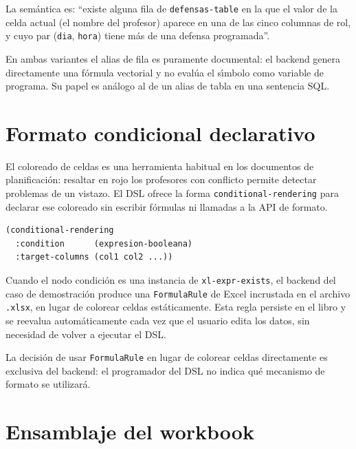 La sem\'antica es: ``existe alguna fila de \texttt{defensas-table} en la que
el valor de la celda actual (el nombre del profesor) aparece en una de las
cinco columnas de rol, y cuyo par (\texttt{dia}, \texttt{hora}) tiene m\'as
de una defensa programada''.

En ambas variantes el alias de fila es puramente documental: el backend
genera directamente una f\'ormula vectorial y no eval\'ua el s\'{\i}mbolo
como variable de programa.  Su papel es an\'alogo al de un alias de tabla
en una sentencia SQL.

\section{Formato condicional declarativo}
\label{sec:formato-condicional-dsl}

El coloreado de celdas es una herramienta habitual en los documentos de
planificaci\'on: resaltar en rojo los profesores con conflicto permite
detectar problemas de un vistazo.  El DSL ofrece la forma
\texttt{conditional-rendering} para declarar ese coloreado sin escribir
f\'ormulas ni llamadas a la API de formato.

\begin{lstlisting}[language=CommonLisp,
  caption={Sintaxis de conditional-rendering.}]
(conditional-rendering
  :condition      (expresion-booleana)
  :target-columns (col1 col2 ...))
\end{lstlisting}

Cuando el nodo condici\'on es una instancia de \texttt{xl-expr-exists}, el
backend del caso de demostraci\'on produce una \texttt{FormulaRule} de Excel
incrustada en el archivo \texttt{.xlsx}, en lugar de colorear celdas
est\'aticamente.  Esta regla persiste en el libro y se reevalua
autom\'aticamente cada vez que el usuario edita los datos, sin necesidad de
volver a ejecutar el DSL.

La decisi\'on de usar \texttt{FormulaRule} en lugar de colorear celdas
directamente es exclusiva del backend: el programador del DSL no indica
qu\'e mecanismo de formato se utilizar\'a.

\section{Ensamblaje del workbook}
\label{sec:workbook}

